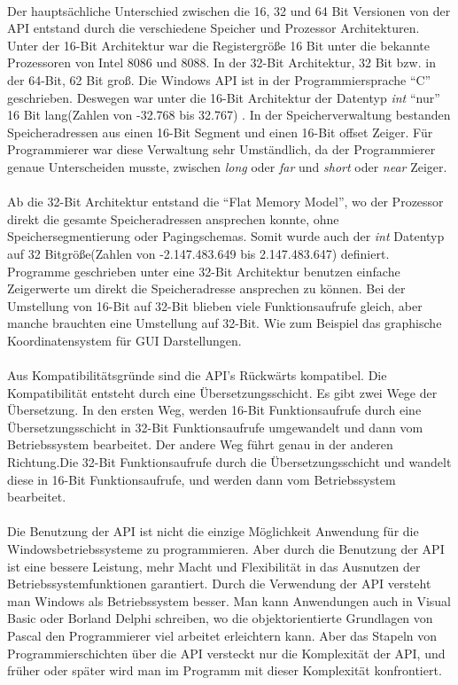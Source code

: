 \paragraph{}
Der hauptsächliche Unterschied zwischen die 16, 32 und 64 Bit Versionen von der API entstand durch die verschiedene Speicher und Prozessor Architekturen. Unter der 16-Bit Architektur war die Registergröße 16 Bit unter die bekannte Prozessoren von Intel 8086 und 8088. In der 32-Bit Architektur, 32 Bit bzw. in der 64-Bit, 62 Bit groß. Die Windows API ist in der Programmiersprache "`C"' geschrieben. Deswegen war unter die 16-Bit Architektur der Datentyp \textit{int} "`nur"' 16 Bit lang(Zahlen von -32.768 bis 32.767) . In der Speicherverwaltung bestanden Speicheradressen aus einen 16-Bit Segment und einen 16-Bit offset Zeiger. Für Programmierer war diese Verwaltung sehr Umständlich, da der Programmierer genaue Unterscheiden musste, zwischen \textit{long} oder \textit{far} und \textit{short} oder \textit{near} Zeiger. 
\paragraph{}
Ab die 32-Bit Architektur entstand die "`Flat Memory Model"', wo der Prozessor direkt die gesamte Speicheradressen ansprechen konnte, ohne Speichersegmentierung oder Pagingschemas. Somit wurde auch der \textit{int} Datentyp auf 32 Bitgröße(Zahlen von -2.147.483.649 bis 2.147.483.647) definiert. Programme geschrieben unter eine 32-Bit Architektur benutzen einfache Zeigerwerte um direkt die Speicheradresse ansprechen zu können. Bei der Umstellung von 16-Bit auf 32-Bit blieben viele Funktionsaufrufe gleich, aber manche brauchten eine Umstellung auf 32-Bit. Wie zum Beispiel das graphische Koordinatensystem für GUI Darstellungen.
\paragraph{}
 Aus Kompatibilitätsgründe sind die API's Rückwärts kompatibel. Die Kompatibilität entsteht durch eine Übersetzungsschicht. Es gibt zwei Wege der Übersetzung. In den ersten Weg, werden 16-Bit Funktionsaufrufe durch eine Übersetzungsschicht in 32-Bit Funktionsaufrufe umgewandelt und dann vom Betriebssystem bearbeitet. Der andere Weg führt genau in der anderen Richtung.Die 32-Bit Funktionsaufrufe durch die Übersetzungsschicht und wandelt diese in 16-Bit Funktionsaufrufe, und werden dann vom Betriebssystem bearbeitet.
\paragraph{}
Die Benutzung der API ist nicht die einzige Möglichkeit Anwendung für die Windowsbetriebssysteme zu programmieren. Aber durch die Benutzung der API ist eine bessere Leistung, mehr Macht und Flexibilität in das Ausnutzen der Betriebssystemfunktionen garantiert. Durch die Verwendung der API versteht man Windows als Betriebssystem besser. Man kann Anwendungen auch in Visual Basic oder Borland Delphi schreiben, wo die objektorientierte Grundlagen von Pascal den Programmierer viel arbeitet erleichtern kann. Aber das Stapeln von Programmierschichten über die API versteckt nur die Komplexität der API, und früher oder später wird man im Programm mit dieser Komplexität konfrontiert.


